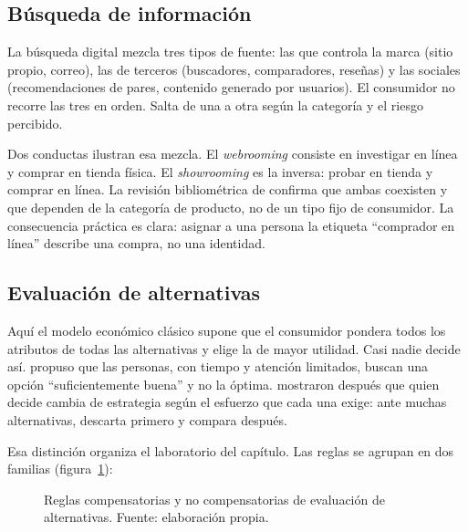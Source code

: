 \subsection{Búsqueda de información}
\label{sec:cap06-busqueda}

La búsqueda digital mezcla tres tipos de fuente: las que controla la marca
(sitio propio, correo), las de terceros (buscadores, comparadores, reseñas) y
las sociales (recomendaciones de pares, contenido generado por usuarios). El
consumidor no recorre las tres en orden. Salta de una a otra según la
categoría y el riesgo percibido.

Dos conductas ilustran esa mezcla. El \textit{webrooming} consiste en
investigar en línea y comprar en tienda física. El \textit{showrooming} es la
inversa: probar en tienda y comprar en línea. La revisión bibliométrica de
\textcite{halibas2023showrooming} confirma que ambas coexisten y que dependen
de la categoría de producto, no de un tipo fijo de consumidor. La
consecuencia práctica es clara: asignar a una persona la etiqueta
\enquote{comprador en línea} describe una compra, no una identidad.

\subsection{Evaluación de alternativas}
\label{sec:cap06-evaluacion}

Aquí el modelo económico clásico supone que el consumidor pondera todos los
atributos de todas las alternativas y elige la de mayor utilidad. Casi nadie
decide así. \textcite{simon1955} propuso que las personas, con tiempo y
atención limitados, buscan una opción \enquote{suficientemente buena} y no la
óptima. \textcite{payne1988adaptive} mostraron después que quien decide
cambia de estrategia según el esfuerzo que cada una exige: ante muchas
alternativas, descarta primero y compara después.

Esa distinción organiza el laboratorio del capítulo. Las reglas se agrupan en
dos familias (figura~\ref{fig:cap06-reglas}):

\begin{figure}[!htb]
  \centering
  \resizebox{0.82\textwidth}{!}{}
  \caption{Reglas compensatorias y no compensatorias de evaluación de
  alternativas. Fuente: elaboración propia.}
  \label{fig:cap06-reglas}
\end{figure}

